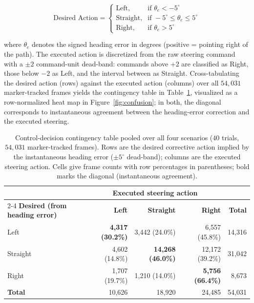 \begin{equation}
\text{Desired Action} =
\begin{cases}
\text{Left}, & \text{if } \theta_e < -5^{\circ} \\
\text{Straight}, & \text{if } -5^{\circ} \le \theta_e \le 5^{\circ} \\
\text{Right}, & \text{if } \theta_e > 5^{\circ}
\end{cases}
\end{equation}

where $\theta_e$ denotes the signed heading error in degrees (positive = pointing right of the path). The executed action is discretized from the raw steering command with a $\pm 2$ command-unit dead-band: commands above $+2$ are classified as Right, those below $-2$ as Left, and the interval between as Straight. Cross-tabulating the desired action (rows) against the executed action (columns) over all $54{,}031$ marker-tracked frames yields the contingency table in Table~\ref{tab:confusion}, visualized as a row-normalized heat map in Figure~\ref{fig:confusion}; in both, the diagonal corresponds to instantaneous agreement between the heading-error correction and the executed steering.

\begin{table}[H]
\centering
\caption{Control-decision contingency table pooled over all four scenarios ($40$ trials, $54{,}031$ marker-tracked frames). Rows are the desired corrective action implied by the instantaneous heading error ($\pm 5^{\circ}$ dead-band); columns are the executed steering action. Cells give frame counts with row percentages in parentheses; bold marks the diagonal (instantaneous agreement).}
\label{tab:confusion}
\footnotesize
\begin{tabular}{@{}l r r r r@{}}
\toprule
 & \multicolumn{3}{c}{\textbf{Executed steering action}} & \\
\cmidrule(lr){2-4}
\textbf{Desired (from heading error)} & \textbf{Left} & \textbf{Straight} & \textbf{Right} & \textbf{Total} \\
\midrule
Left     & \textbf{4{,}317 (30.2\%)} & 3{,}442 (24.0\%) & 6{,}557 (45.8\%) & 14{,}316 \\
Straight & 4{,}602 (14.8\%) & \textbf{14{,}268 (46.0\%)} & 12{,}172 (39.2\%) & 31{,}042 \\
Right    & 1{,}707 (19.7\%) & 1{,}210 (14.0\%) & \textbf{5{,}756 (66.4\%)} & 8{,}673 \\
\midrule
\textbf{Total} & 10{,}626 & 18{,}920 & 24{,}485 & 54{,}031 \\
\bottomrule
\end{tabular}
\end{table}

